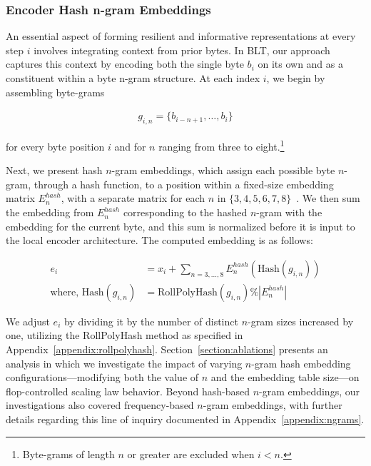 \subsubsection{Encoder Hash n-gram Embeddings}
\label{sec:ngram-emb}
\label{sec:hash-emb}
An essential aspect of forming resilient and informative representations at every step $i$ involves integrating context from prior bytes. In {\textsc BLT}, our approach captures this context by encoding both the single byte $b_i$ on its own and as a constituent within a byte n-gram structure. At each index $i$, we begin by assembling byte-grams

\begin{align}
    g_{i,n}=\{b_{i-n + 1},\ldots, b_i\}
\end{align}

for every byte position $i$ and for $n$ ranging from three to eight.\footnote{
Byte-grams of length $n$ or greater are excluded when $i<n$. }

Next, we present hash $n$-gram embeddings, which assign each possible byte $n$-gram, through a hash function, to a position within a fixed-size embedding matrix $E_{n}^{hash}$, with a separate matrix for each $n$ in $\{3,4,5,6,7,8\}$~\citep{bai2010learning}.
We then sum the embedding from $E_{n}^{hash}$ corresponding to the hashed $n$-gram with the embedding for the current byte, and this sum is normalized before it is input to the local encoder architecture. The computed embedding is as follows:

\begin{align}
e_i &= x_i + \sum_{n = 3,...,8}E_{n}^{hash}(\text{Hash}(g_{i,n})) \\
\text{where, Hash}(g_{i,n}) &= \text{RollPolyHash}(g_{i,n}) \% |E_{n}^{hash}|
\end{align}

We adjust $e_i$ by dividing it by the number of distinct $n$-gram sizes increased by one, utilizing the RollPolyHash method as specified in Appendix~\ref{appendix:rollpolyhash}. Section~\ref{section:ablations} presents an analysis in which we investigate the impact of varying $n$-gram hash embedding configurations—modifying both the value of $n$ and the embedding table size—on flop-controlled scaling law behavior. Beyond hash-based $n$-gram embeddings, our investigations also covered frequency-based $n$-gram embeddings, with further details regarding this line of inquiry documented in Appendix~\ref{appendix:ngrams}.

